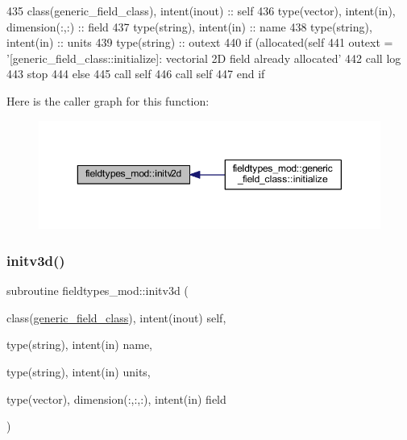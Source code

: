 \begin{DoxyCode}
435     \textcolor{keywordtype}{class}(generic\_field\_class), \textcolor{keywordtype}{intent(inout)} :: self
436     \textcolor{keywordtype}{type}(vector), \textcolor{keywordtype}{intent(in)}, \textcolor{keywordtype}{dimension(:,:)} :: field
437     \textcolor{keywordtype}{type}(string), \textcolor{keywordtype}{intent(in)} :: name
438     \textcolor{keywordtype}{type}(string), \textcolor{keywordtype}{intent(in)} :: units
439     \textcolor{keywordtype}{type}(string) :: outext
440     \textcolor{keywordflow}{if} (\textcolor{keyword}{allocated}(self%
441         outext = \textcolor{stringliteral}{'[generic\_field\_class::initialize]: vectorial 2D field already allocated'}
442         \textcolor{keyword}{call }log%
443         stop
444     \textcolor{keywordflow}{else}
445         \textcolor{keyword}{call }self%
446         \textcolor{keyword}{call }self%
447 \textcolor{keywordflow}{    end if}
\end{DoxyCode}
Here is the caller graph for this function\+:\nopagebreak
\begin{figure}[H]
\begin{center}
\leavevmode
\includegraphics[width=350pt]{namespacefieldtypes__mod_ad1af664e23793260f9c2fcd03829a1f5_icgraph}
\end{center}
\end{figure}
\mbox{\label{namespacefieldtypes__mod_aa0a152c9e5131d3003cc34e4f3b2974d}} 
\subsubsection{\texorpdfstring{initv3d()}{initv3d()}}
{\footnotesize\ttfamily subroutine fieldtypes\+\_\+mod\+::initv3d (\begin{DoxyParamCaption}\item[{class(\mbox{\hyperlink{structfieldtypes__mod_1_1generic__field__class}{generic\+\_\+field\+\_\+class}}), intent(inout)}]{self,  }\item[{type(string), intent(in)}]{name,  }\item[{type(string), intent(in)}]{units,  }\item[{type(vector), dimension(\+:,\+:,\+:), intent(in)}]{field }\end{DoxyParamCaption})\hspace{0.3cm}{\ttfamily [private]}}



